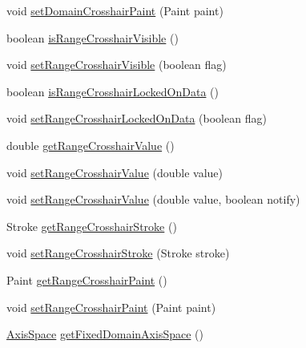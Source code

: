 \begin{DoxyCompactItemize}
void \mbox{\hyperlink{classorg_1_1jfree_1_1chart_1_1plot_1_1_x_y_plot_a7b47895577fbe1e7194037629f93b7e8}{set\+Domain\+Crosshair\+Paint}} (Paint paint)
\item 
boolean \mbox{\hyperlink{classorg_1_1jfree_1_1chart_1_1plot_1_1_x_y_plot_a141d93dd4ffb2ed0a73aa37e745ed9ee}{is\+Range\+Crosshair\+Visible}} ()
\item 
void \mbox{\hyperlink{classorg_1_1jfree_1_1chart_1_1plot_1_1_x_y_plot_a0ac34a6f57e3bbcfaba9a502be7fbe2e}{set\+Range\+Crosshair\+Visible}} (boolean flag)
\item 
boolean \mbox{\hyperlink{classorg_1_1jfree_1_1chart_1_1plot_1_1_x_y_plot_accbd1041d24c450ed59fe379584ae4b8}{is\+Range\+Crosshair\+Locked\+On\+Data}} ()
\item 
void \mbox{\hyperlink{classorg_1_1jfree_1_1chart_1_1plot_1_1_x_y_plot_a9597685c8e47dee16585b24a3bd46e70}{set\+Range\+Crosshair\+Locked\+On\+Data}} (boolean flag)
\item 
double \mbox{\hyperlink{classorg_1_1jfree_1_1chart_1_1plot_1_1_x_y_plot_a5ea3dd940ae92c3196aa77833a6c96d1}{get\+Range\+Crosshair\+Value}} ()
\item 
void \mbox{\hyperlink{classorg_1_1jfree_1_1chart_1_1plot_1_1_x_y_plot_ac6bdd558bdf17eb82e743b060e8170e8}{set\+Range\+Crosshair\+Value}} (double value)
\item 
void \mbox{\hyperlink{classorg_1_1jfree_1_1chart_1_1plot_1_1_x_y_plot_a8c01d8f1d54f631d76b28a6833302360}{set\+Range\+Crosshair\+Value}} (double value, boolean notify)
\item 
Stroke \mbox{\hyperlink{classorg_1_1jfree_1_1chart_1_1plot_1_1_x_y_plot_a0df9848d6644ca9e10d4b4221c53afa1}{get\+Range\+Crosshair\+Stroke}} ()
\item 
void \mbox{\hyperlink{classorg_1_1jfree_1_1chart_1_1plot_1_1_x_y_plot_a8e66a4d694e64fad71b706a7ca7e1de2}{set\+Range\+Crosshair\+Stroke}} (Stroke stroke)
\item 
Paint \mbox{\hyperlink{classorg_1_1jfree_1_1chart_1_1plot_1_1_x_y_plot_ab531ad9c9bd346bb3c90e9416097e898}{get\+Range\+Crosshair\+Paint}} ()
\item 
void \mbox{\hyperlink{classorg_1_1jfree_1_1chart_1_1plot_1_1_x_y_plot_abea680edc849d51e1dfab077c33e8c61}{set\+Range\+Crosshair\+Paint}} (Paint paint)
\item 
\mbox{\hyperlink{classorg_1_1jfree_1_1chart_1_1axis_1_1_axis_space}{Axis\+Space}} \mbox{\hyperlink{classorg_1_1jfree_1_1chart_1_1plot_1_1_x_y_plot_addf279078b32787b75a4562fb61734be}{get\+Fixed\+Domain\+Axis\+Space}} ()
\item 

\end{DoxyCompactItemize}
